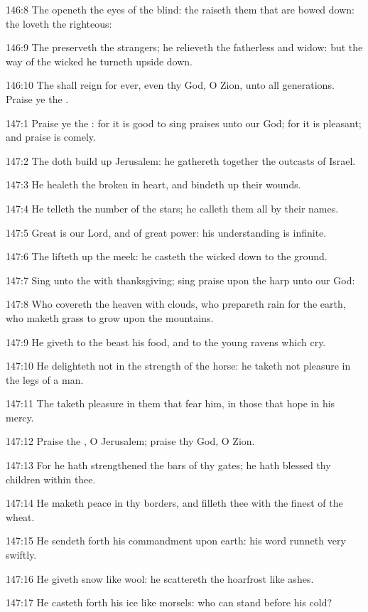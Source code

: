 146:8 The \LORD openeth the eyes of the blind: the \LORD raiseth them
that are bowed down: the \LORD loveth the righteous:

146:9 The \LORD preserveth the strangers; he relieveth the fatherless
and widow: but the way of the wicked he turneth upside down.

146:10 The \LORD shall reign for ever, even thy God, O Zion, unto all
generations. Praise ye the \LORD.



147:1 Praise ye the \LORD: for it is good to sing praises unto our God;
for it is pleasant; and praise is comely.

147:2 The \LORD doth build up Jerusalem: he gathereth together the
outcasts of Israel.

147:3 He healeth the broken in heart, and bindeth up their wounds.

147:4 He telleth the number of the stars; he calleth them all by their
names.

147:5 Great is our Lord, and of great power: his understanding is
infinite.

147:6 The \LORD lifteth up the meek: he casteth the wicked down to the
ground.

147:7 Sing unto the \LORD with thanksgiving; sing praise upon the harp
unto our God:

147:8 Who covereth the heaven with clouds, who prepareth rain for the
earth, who maketh grass to grow upon the mountains.

147:9 He giveth to the beast his food, and to the young ravens which
cry.

147:10 He delighteth not in the strength of the horse: he taketh not
pleasure in the legs of a man.

147:11 The \LORD taketh pleasure in them that fear him, in those that
hope in his mercy.

147:12 Praise the \LORD, O Jerusalem; praise thy God, O Zion.

147:13 For he hath strengthened the bars of thy gates; he hath blessed
thy children within thee.

147:14 He maketh peace in thy borders, and filleth thee with the
finest of the wheat.

147:15 He sendeth forth his commandment upon earth: his word runneth
very swiftly.

147:16 He giveth snow like wool: he scattereth the hoarfrost like
ashes.

147:17 He casteth forth his ice like morsels: who can stand before his
cold?

